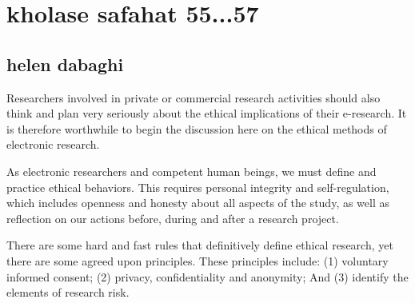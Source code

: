 \documentclass [12pt]{beamer}
\begin{document}
\section*{kholase safahat 55...57}
\subsection*{helen dabaghi  }	
\begin{frame}
\justifying	
Researchers involved in private or commercial research activities should also think and plan very seriously about the ethical implications of their e-research.  It is therefore worthwhile to begin the discussion here on the ethical methods of electronic research.
\end{frame}

\begin{frame}
\justifying	
As electronic researchers and competent human beings, we must define and practice ethical behaviors.  This requires personal integrity and self-regulation, which includes openness and honesty about all aspects of the study, as well as reflection on our actions before, during and after a research project.
\end{frame}

\begin{frame}
\justifying	
There are some hard and fast rules that definitively define ethical research, yet there are some agreed upon principles.  These principles include: (1) voluntary informed consent;  (2) privacy, confidentiality and anonymity;  And (3) identify the elements of research risk.
\end{frame}
\end{document}
